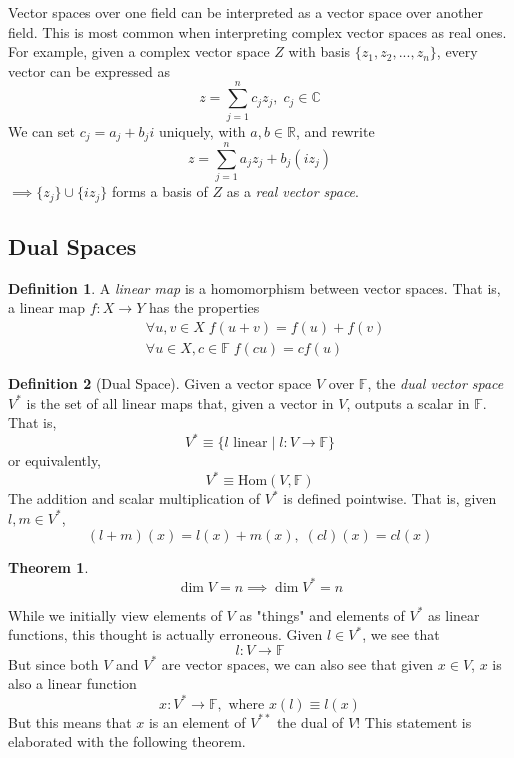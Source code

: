 \documentclass{article}
\newtheorem{theorem}{Theorem}[section]
\theoremstyle{remark}
\theoremstyle{definition}
\newtheorem{definition}{Definition}[section]
\begin{document}
    Vector spaces over one field can be interpreted as a vector space over another field. This is most common when interpreting complex vector spaces as real ones. For example, given a complex vector space $Z$ with basis $\{z_1, z_2, ..., z_n\}$, every vector can be expressed as
    \[z = \sum_{j=1}^n c_j z_j, \; c_j \in \mathbb{C}\]
    We can set $c_j = a_j + b_j i$ uniquely, with $a, b \in \mathbb{R}$, and rewrite
    \[z = \sum_{j=1}^n a_j z_j + b_j (i z_j)\]
    $\implies \{ z_j\} \cup \{ i z_j\}$ forms a basis of $Z$ as a \textit{real vector space}. 

  \subsection{Dual Spaces}

    \begin{definition}
    A \textit{linear map} is a homomorphism between vector spaces. That is, a linear map $f: X \longrightarrow Y$ has the properties 
    \begin{align*}
        & \forall u, v \in X \; f(u + v) = f(u) + f(v) \\
        & \forall u \in X, c \in \mathbb{F} \; f(c u) = c f(u) 
    \end{align*}
    \end{definition}

    \begin{definition}[Dual Space]
    Given a vector space $V$ over $\mathbb{F}$, the \textit{dual vector space} $V^*$ is the set of all linear maps that, given a vector in $V$, outputs a scalar in $\mathbb{F}$. That is, 
    \[ V^* \equiv \{ l \text{ linear} \; | \; l: V \longrightarrow \mathbb{F}\}\]
    or equivalently, 
    \[V^* \equiv \text{Hom}(V, \mathbb{F})\]
    The addition and scalar multiplication of $V^*$ is defined pointwise. That is, given $l, m \in V^*$, 
    \[(l + m) (x) = l(x) + m(x), \; (c l)(x) = c l(x)\]
    \end{definition}

    \begin{theorem}
    \[ \dim{V} = n \implies \dim{V^*} = n\]
    \end{theorem}

    While we initially view elements of $V$ as "things" and elements of $V^*$ as linear functions, this thought is actually erroneous. Given $l \in V^*$, we see that 
    \[l: V \longrightarrow \mathbb{F}\]
    But since both $V$ and $V^*$ are vector spaces, we can also see that given $x \in V$, $x$ is also a linear function 
    \[x: V^* \longrightarrow \mathbb{F}, \text{ where } x(l) \equiv l(x)\]
    But this means that $x$ is an element of $V^{**}$ the dual of $V$! This statement is elaborated with the following theorem. 
\end{document}

